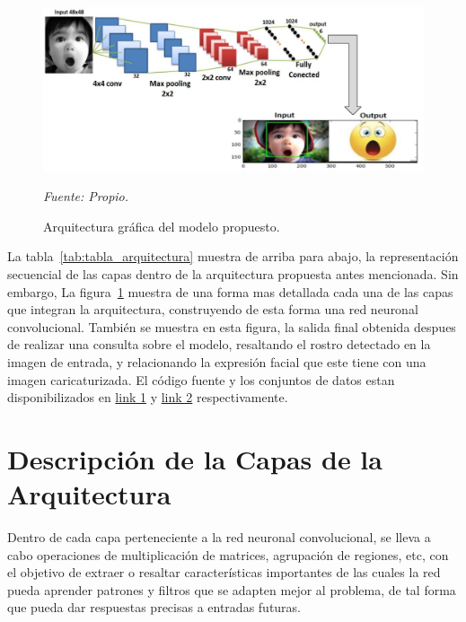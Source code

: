 \begin{figure}[H]
		\centering
		\includegraphics[width=180mm]{Imagenes/arquitectura_CNN_grafico.pdf}
		\caption{Arquitectura gráfica del modelo propuesto.}
		\vspace{0.15cm}
		\textit{Fuente: Propio.}
		\label{fig:arquitectura_CNN_grafico}
\end{figure}

La tabla~\ref{tab:tabla_arquitectura} muestra de arriba para abajo, la representación secuencial de las capas dentro de la arquitectura propuesta antes mencionada. Sin embargo, La figura~\ref{fig:arquitectura_CNN_grafico} muestra de una forma mas detallada cada una de las capas que integran la arquitectura, construyendo de esta forma una red neuronal convolucional. También se muestra en esta figura, la salida final obtenida despues de realizar una consulta sobre el modelo, resaltando el rostro detectado en la imagen de entrada, y relacionando la expresión facial que este tiene con una imagen caricaturizada. El código fuente y los conjuntos de datos estan disponibilizados en
\href{https://github.com/CodeBlueDS/Code---Facial-expression-recognition-}{link 1} y \href{https://drive.google.com/drive/folders/1vMJIC8TW1NX7ffMbyZPraySLGV6hnGK7?usp=sharing}{link 2} respectivamente.

\section{Descripción de la Capas de la Arquitectura}

Dentro de cada capa perteneciente a la red neuronal convolucional, se lleva a cabo operaciones de multiplicación de matrices, agrupación de regiones, etc, con el objetivo de extraer o resaltar características importantes de las cuales la red pueda aprender patrones y filtros que se adapten mejor al problema, de tal forma que pueda dar respuestas precisas a entradas futuras. 

